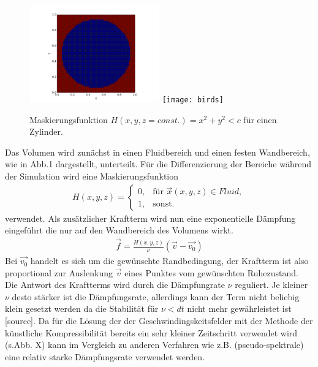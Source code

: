 \begin{figure}
  \begin{center}
  \includegraphics[width=0.5\textwidth]{gfx/immersed_boundary_methods/mask.png}\label{fig:mask_vp}
    \texttt{[image: birds]}
  \end{center}
  \caption{Maskierungsfunktion $H(x,y,z=const.) = x^2 + y^2 < c$ für einen Zylinder. }
\end{figure}

Das Volumen wird zunächst in einen Fluidbereich und einen festen Wandbereich, wie in Abb.1 dargestellt, unterteilt. Für die Differenzierung der Bereiche während der Simulation wird  eine Maskierungsfunktion
\begin{align}
H(x, y, z) = \begin{cases}
                    0, & \text{für } \vec{x}(x,y,z) \in Fluid, \\
                    1, & \text{sonst}.
             \end{cases}
\end{align}
verwendet. Als zusätzlicher Kraftterm wird nun eine exponentielle Dämpfung eingeführt die nur auf den Wandbereich des Volumens wirkt.
\begin{align}
\vec{f} = \frac{H(x, y, z)}{\nu}(\vec{v} - \vec{v_0})
\end{align}
Bei $\vec{v_0}$ handelt es sich um die gewünschte Randbedingung, der Kraftterm ist also proportional zur Auslenkung $\vec{v}$ eines Punktes vom gewünschten Ruhezustand.
Die Antwort des Kraftterms wird durch die Dämpfungrate $\nu$ reguliert. Je kleiner $\nu$ desto stärker ist die Dämpfungsrate, allerdings kann der Term
nicht beliebig klein gesetzt werden da die Stabilität für $\nu < dt$ nicht mehr gewährleistet ist [source].
Da für die Lösung der der Geschwindingskeitsfelder mit der Methode der künstliche Kompressibilität  bereits ein sehr kleiner Zeitschritt verwendet wird (s.Abb. X)
kann im Vergleich zu anderen Verfahren wie z.B. (pseudo-spektrale) eine relativ starke Dämpfungsrate verwendet werden.


